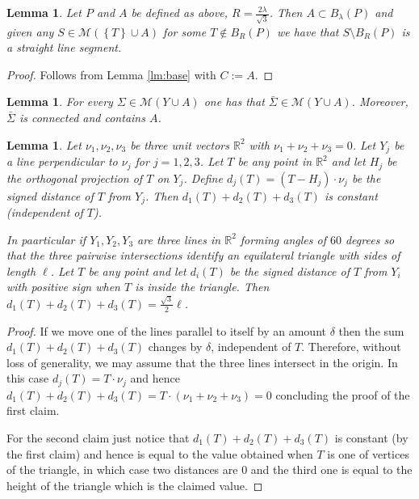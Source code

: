 \documentclass{article}
\newcommand{\RR}{\mathbb R}
\newcommand{\ENCLOSE}[1]{\left\{#1\right\}}
\newcommand{\M}{\mathcal{M}}
\newtheorem{lemma}[theorem]{Lemma}
\theoremstyle{definition}
\theoremstyle{remark}
\begin{document}
\begin{lemma}\label{lm:01}
  Let $P$ and $A$ be defined as above,
  $R=\frac{2\lambda}{\sqrt 3}$.
  Then $A\subset B_\lambda(P)$ and 
  given any $S\in \M(\ENCLOSE{T}\cup A)$ 
  for some $T\not \in B_R(P)$
  we have that $S\setminus B_R(P)$ is a straight line segment.
\end{lemma}
\begin{proof}
  Follows from Lemma \ref{lm:base} with $C:=A$.
\end{proof}

\begin{lemma} 
  For every $\Sigma \in \M(Y\cup A)$ one has that $\bar\Sigma\in \M(Y\cup A)$.
  Moreover, $\bar\Sigma$ is connected and contains $A$.
\end{lemma}

\begin{lemma}\label{lm:tripod}
  Let $\nu_1,\nu_2,\nu_3$ be three unit vectors $\RR^2$
  with $\nu_1+\nu_2+\nu_3=0$. 
  Let $Y_j$ be a line perpendicular to $\nu_j$ for $j=1,2,3$.
  Let $T$ be any point in $\RR^2$ and let $H_j$ be the orthogonal 
  projection of $T$ on $Y_j$.
  Define $d_j(T) = (T-H_j)\cdot \nu_j$
  be the signed distance of $T$ from $Y_j$.
  Then $d_1(T) + d_2(T) + d_3(T)$ is constant (independent of $T$).

  In paarticular if $Y_1,Y_2,Y_3$ are three lines in $\RR^2$
  forming angles of $60$ degrees so that 
  the three pairwise intersections identify
  an equilateral triangle with sides of length $\ell$.
  Let $T$ be any point and let $d_i(T)$ be 
  the signed distance of $T$ from $Y_i$
  with positive sign when $T$ is inside the triangle.
  Then $d_1(T) + d_2(T) + d_3(T) = \frac{\sqrt 3}{2}\ell$.
\end{lemma}
\begin{proof}
  If we move one of the lines parallel to itself by an amount $\delta$ 
  then the sum $d_1(T)+d_2(T)+d_3(T)$ changes by $\delta$, independent 
  of $T$.
  Therefore, without loss of generality, we may assume that the three lines 
  intersect in the origin.
  In this case $d_j(T) = T\cdot \nu_j$ and hence 
  $d_1(T)+d_2(T)+d_3(T) = T\cdot (\nu_1+\nu_2+\nu_3) = 0$
  concluding the proof of the first claim.

  For the second claim just notice that $d_1(T)+d_2(T)+d_3(T)$
  is constant (by the first claim) and hence is equal to the value 
  obtained when $T$ is one of vertices of the triangle, in which case 
  two distances are $0$ and the third one is equal to the height of the 
  triangle which is the claimed value.
\end{proof}
\end{document}
